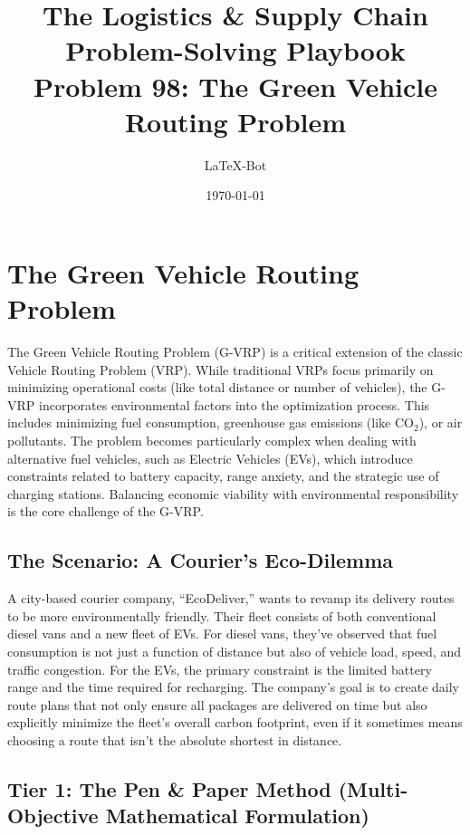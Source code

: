 \documentclass{article}
\begin{document}
\title{The Logistics \& Supply Chain Problem-Solving Playbook\\Problem 98: The Green Vehicle Routing Problem}
\author{LaTeX-Bot}
\date{\today}
\maketitle

\section{The Green Vehicle Routing Problem}

The Green Vehicle Routing Problem (G-VRP) is a critical extension of the classic Vehicle Routing Problem (VRP). While traditional VRPs focus primarily on minimizing operational costs (like total distance or number of vehicles), the G-VRP incorporates environmental factors into the optimization process. This includes minimizing fuel consumption, greenhouse gas emissions (like CO$_2$), or air pollutants. The problem becomes particularly complex when dealing with alternative fuel vehicles, such as Electric Vehicles (EVs), which introduce constraints related to battery capacity, range anxiety, and the strategic use of charging stations. Balancing economic viability with environmental responsibility is the core challenge of the G-VRP.

\subsection{The Scenario: A Courier's Eco-Dilemma}

A city-based courier company, ``EcoDeliver,'' wants to revamp its delivery routes to be more environmentally friendly. Their fleet consists of both conventional diesel vans and a new fleet of EVs. For diesel vans, they've observed that fuel consumption is not just a function of distance but also of vehicle load, speed, and traffic congestion. For the EVs, the primary constraint is the limited battery range and the time required for recharging. The company's goal is to create daily route plans that not only ensure all packages are delivered on time but also explicitly minimize the fleet's overall carbon footprint, even if it sometimes means choosing a route that isn't the absolute shortest in distance.

\subsection{Tier 1: The Pen \& Paper Method (Multi-Objective Mathematical Formulation)}
\end{document}
